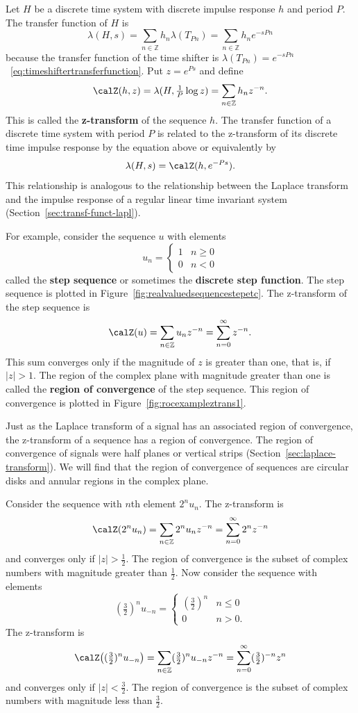 \documentclass[11pt,a4paper]{book}
\theoremstyle{plain}
\numberwithin{equation}{section}
\newcommand{\ints}{{\mathbb Z}}
\newcommand{\term}{\textbf}
\newcommand{\abs}[1]{\left\vert #1 \right\vert}
\begin{document}
Let $H$ be a discrete time system with discrete impulse response $h$ and period $P$.  The transfer function of $H$ is
\[
\lambda(H,s) = \sum_{n \in \ints} h_n \lambda( T_{Pn} ) = \sum_{n \in \ints} h_n e^{-sP n}
\]
because the transfer function of the time shifter is $\lambda(T_{Pn}) = e^{-sPn}$~\eqref{eq:timeshiftertransferfunction}.  Put $z = e^{Ps}$ and define
\[
\calZ(h,z) = \lambda(H, \tfrac{1}{P} \log z) = \sum_{n \in \ints} h_n z^{-n}.
\]
This is called the \term{z-transform} of the sequence $h$.  The transfer function of a discrete time system with period $P$ is related to the z-transform of its discrete time impulse response by the equation above or equivalently by
\[
\lambda(H,s) = \calZ(h,e^{-Ps}).
\]  
This relationship is analogous to the relationship between the Laplace transform and the impulse response of a regular linear time invariant system (Section~\ref{sec:transf-funct-lapl}).

For example, consider the sequence $u$ with elements 
\[
u_n = \begin{cases} 
1 & n \geq 0 \\
0 & n < 0 
\end{cases}
\]
called the \term{step sequence} or sometimes the \term{discrete step function}.  The step sequence is plotted in Figure~\ref{fig:realvaluedsequencestepetc}.  The z-transform of the step sequence is
\[
\calZ(u) = \sum_{n \in \ints} u_n z^{-n} = \sum_{n=0}^\infty z^{-n}.
\]
This sum converges only if the magnitude of $z$ is greater than one, that is, if $\abs{z} > 1$.  The region of the complex plane with magnitude greater than one is called the \term{region of convergence} of the step sequence.  This region of convergence is plotted in Figure~\ref{fig:rocexampleztrans1}. 

Just as the Laplace transform of a signal has an associated region of convergence, the z-transform of a sequence has a region of convergence.  The region of convergence of signals were half planes or vertical strips (Section~\ref{sec:laplace-transform}).  We will find that the region of convergence of sequences are circular disks and annular regions in the complex plane.

Consider the sequence with $n$th element $2^{n} u_n$.  The z-transform is 
\[
\calZ(2^{n} u_n) = \sum_{n \in \ints} 2^n u_n z^{-n} = \sum_{n=0}^\infty 2^n z^{-n}
\]
and converges only if $\abs{z} > \tfrac{1}{2}$.  The region of convergence is the subset of complex numbers with magnitude greater than $\tfrac{1}{2}$.  Now consider the sequence with elements 
\[
(\tfrac{3}{2})^{n} u_{-n} =  \begin{cases} 
(\tfrac{3}{2})^{n} & n \leq 0 \\
0 & n > 0.
\end{cases}
\]
The z-transform is
\[
\calZ\big( (\tfrac{3}{2})^{n} u_{-n} \big) = \sum_{n \in \ints} (\tfrac{3}{2})^{n} u_{-n} z^{-n} = \sum_{n=0}^\infty (\tfrac{3}{2})^{-n} z^{n}
\]
and converges only if $\abs{z} < \tfrac{3}{2}$.  The region of convergence is the subset of complex numbers with magnitude less than $\tfrac{3}{2}$.
\end{document}
